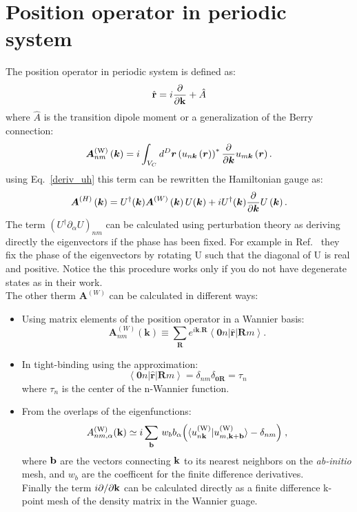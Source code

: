 \documentclass[preprint,showpacs,prb,superscriptaddress,aps,floatfix]{revtex4-1}
\newcommand{\bb}{{\bf b}}
\newcommand{\rr}{{\bf r}}
\newcommand{\kk}{{\bf k}}
\newcommand{\be}{\begin{equation}}
\newcommand{\ee}{\end{equation}}
\renewcommand{\[}{\left[}
\renewcommand{\]}{\right]}
\renewcommand{\(}{\left(}
\renewcommand{\)}{\right)}
\def\pw{^{({\rm W})}}
\begin{document}
\section{Position operator in periodic system}
The position operator in periodic system is defined as:\cite{blount1962solid}
\be
\hat \rr = i \frac{\partial}{\partial \kk} + \hat A
\ee
where $\hat A$ is the transition dipole moment or a generalization of the Berry connection:\cite{silva2019high,wang2006ab}
\be
\boldsymbol{A}\pw_{nm}\left(\boldsymbol{k}\right)=i\int_{V_{C}}d^{D}\boldsymbol{r}\left(u_{n\boldsymbol{k}}\left(\boldsymbol{r}\right)\right)^{*}\frac{\partial}{\partial\boldsymbol{k}}u_{m\boldsymbol{k}}\left(\boldsymbol{r}\right).
\ee
using Eq.~\ref{deriv_uh} this term can be rewritten the Hamiltonian gauge as:
\begin{equation}
\boldsymbol{A}^{\left(H\right)}\left(\boldsymbol{k}\right)=U^{\dagger}\text{\ensuremath{\left(\boldsymbol{k}\right)}}\boldsymbol{A}^{\left(W\right)}\left(\boldsymbol{k}\right)U\text{\ensuremath{\left(\boldsymbol{k}\right)}}+iU^{\dagger}\text{\ensuremath{\left(\boldsymbol{k}\right)}}\frac{\partial}{\partial\boldsymbol{k}}U\left(\boldsymbol{k}\right).
\end{equation}
The term $(U^{\dagger}\partial_{\alpha}U)_{nm}$ can be calculated using perturbation theory as deriving directly the eigenvectors if the phase has been fixed. For example in Ref.~ they fix the phase of the eigenvectors by rotating U such that the diagonal of U is real and positive. Notice the this procedure works only if you do not have degenerate states as in their work.\\
The other therm $\boldsymbol{A}^{\left(W\right)}$ can be calculated in different ways: 
\begin{itemize}
\item
Using matrix elements of the position operator in a Wannier basis:
\be
\boldsymbol{A}_{nm}^{(W)}\left(\boldsymbol{k}\right)  \equiv\sum_{\boldsymbol{R}}e^{i\boldsymbol{k}.\boldsymbol{R}}\left\langle \boldsymbol{0}n\left|\hat{\boldsymbol{r}}\right|\boldsymbol{R}m\right\rangle .\label{eq:Berry_connection_Wannier}
\ee
\item In tight-binding using the approximation:\cite{silva2019high}
\be
		\left\langle \boldsymbol{0}n\left|\hat{\boldsymbol{r}}\right|\boldsymbol{R}m\right\rangle=\delta_{nm}\delta_{\boldsymbol{0} \boldsymbol{R}} = \tau_n
\ee
where $\tau_n$ is the center of the n-Wannier function.
\item 
	From the overlaps of the eigenfunctions:\cite{wang2006ab}
	\begin{equation}
        A_{nm,\alpha}\pw(\kk)\simeq
        i\sum_\bb\,
        w_b b_{\alpha}\Big ( \langle u_{n\kk}\pw|u_{m,\kk+\bb}\pw
        \rangle
        - \delta_{nm}\Big )\;,
\label{eq:A_dis}
\end{equation}
%
where $\bb$ are the vectors connecting $\kk$ to its nearest
neighbors on the {\it ab-initio} mesh, and $w_b$ are the coefficent for the finite difference derivatives. \\
Finally the term  $i {\partial}/{\partial \kk}$ can be calculated directly as a finite difference k-point mesh of the density matrix in the Wannier guage.
\end{itemize}
\appendix
\end{document}

